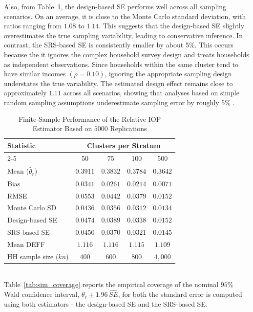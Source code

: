 \documentclass[12pt]{article}
\theoremstyle{plain}
\theoremstyle{definition}
\begin{document}
Also, from Table~\ref{tab:sim_consistency}, the design-based SE performs well across all sampling scenarios. On an average, it is close to the Monte Carlo standard deviation, with ratios ranging from $1.08$ to $1.14$. This suggests that the design-based SE slightly overestimates the true sampling variability, leading to conservative inference. In contrast, the SRS-based SE is consistently smaller by about 5\%. This occurs because the it ignores the complex household survey design and treats households as independent observations. Since households within the same cluster tend to have similar incomes $(\rho=0.10)$, ignoring the appropriate sampling design understates the true variability. The estimated design effect remains close to approximately $1.11$ across all scenarios, showing that analyses based on simple random sampling assumptions underestimate sampling error by roughly 5\% .
\begin{table}[ht]
\centering
\caption{Finite-Sample Performance of the Relative IOP Estimator Based on $5000$ Replications}
\label{tab:sim_consistency}
\begin{tabular}{l|cccc}
\hline
Statistic & \multicolumn{4}{c}{Clusters per Stratum} \\
\cline{2-5}
 & 50 & 75 & 100 & 500 \\
\hline
Mean ($\bar{\hat{\theta}}_r$)
  & $0.3911$ & $0.3832$ & $0.3784$ & $0.3642$ \\
Bias
  & $0.0341$ & $0.0261$ & $0.0214$ & $0.0071$ \\
RMSE
  & $0.0553$ & $0.0442$ & $0.0379$ & $0.0152$ \\
Monte Carlo SD
  & $0.0436$ & $0.0356$ & $0.0312$ & $0.0134$ \\
Design-based SE
  & $0.0474$ & $0.0389$ & $0.0338$ & $0.0152$ \\
SRS-based SE
  & $0.0450$ & $0.0370$ & $0.0321$ & $0.0145$ \\
Mean DEFF
  & $1.116$  & $1.116$  & $1.115$  & $1.109$  \\
HH sample size ($kn$)
  & $400$ & $600$ & $800$ & $4{,}000$ \\
  \hline
\end{tabular}
\end{table}\\

Table~\ref{tab:sim_coverage} reports the empirical coverage of the nominal $95\%$ Wald confidence interval, $\hat{\theta}_r \pm 1.96\,\widehat{SE}$, for both the standard error is computed using both estimators - the design-based SE and the SRS-based SE.
\end{document}
